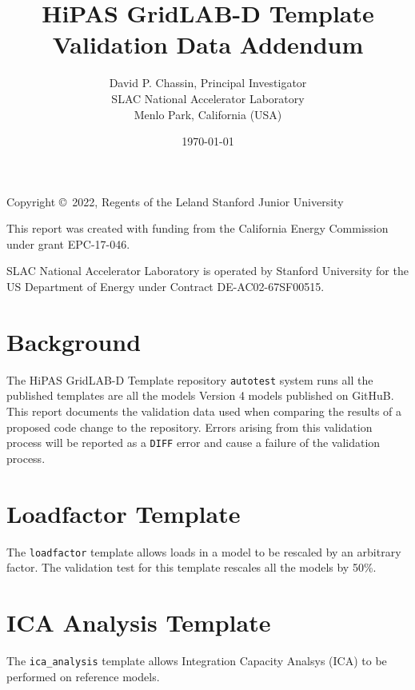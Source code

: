 \documentclass{article}
\title
{
	HiPAS GridLAB-D Template Validation Data Addendum
}
\author
{
	David P. Chassin, Principal Investigator
\\
	SLAC National Accelerator Laboratory
\\
	Menlo Park, California (USA) 
}
\date { \today }
\def\code#1{\texttt{#1}}
\begin{document}
\maketitle

\center 
{
	Copyright \copyright\ 2022, Regents of the Leland Stanford Junior University

\vspace{1cm}

	This report was created with funding from the California Energy Commission under grant EPC-17-046.

\vspace{1cm}

	SLAC National Accelerator Laboratory is operated by Stanford University for the US Department of Energy
	under Contract DE-AC02-67SF00515.
}

\newpage

\tableofcontents

\newpage

\listoftables

\newpage

\section{Background}

The HiPAS GridLAB-D Template repository \code{autotest} system runs all the published templates are all the models Version 4 models published on GitHuB. This report documents the validation data used when comparing the results of a proposed code change to the repository. Errors arising from this validation process will be reported as a \code{DIFF} error and cause a failure of the validation process.

\section{Loadfactor Template}

The \code{loadfactor} template allows loads in a model to be rescaled by an arbitrary factor. The validation test for this template rescales all the models by 50\%.



\section{ICA Analysis Template}

The \code{ica\_analysis} template allows Integration Capacity Analsys (ICA) to be performed on reference models. 



\end{document}
